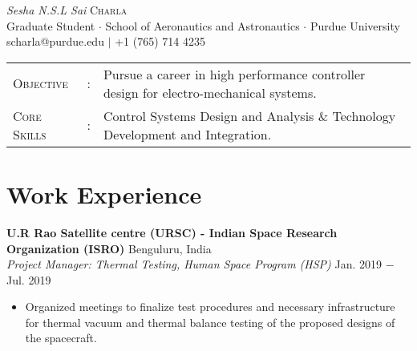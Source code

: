 \documentclass[letterpaper,10pt]{article}
\begin{document}
\begin{center}
\thispagestyle{empty}
\huge{\textit{Sesha N.S.L Sai} \textsc{Charla}}\\
\small Graduate Student $\cdot$ School of Aeronautics and Astronautics $\cdot$ Purdue University\\
\small scharla@purdue.edu $\mid$ +1 (765) 714 4235   \\
\end{center}



\begin{tabular}{l c l}
    {\large{\textsc{Objective}}}&:& Pursue a career in high performance controller design for electro-mechanical systems.\\
	{\large{\textsc{Core Skills}}}&:& Control Systems Design and Analysis \& Technology Development and Integration. %
\end{tabular}


\section{Work Experience}
\noindent \textbf{U.R Rao Satellite centre (URSC) - Indian Space Research Organization (ISRO)} \hfill Benguluru, India \\
\textit{Project Manager: Thermal Testing, Human Space Program (HSP)} \hfill Jan. 2019 $-$ Jul. 2019
\begin{itemize}[noitemsep,nolistsep,leftmargin=0.25in,label={--}]
    \item Organized meetings to finalize test procedures and necessary infrastructure for thermal vacuum and thermal balance testing of the proposed designs of the spacecraft.
\end{itemize}
\end{document}
